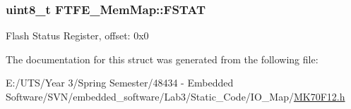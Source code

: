 \subsubsection[{F\+S\+T\+A\+T}]{\setlength{\rightskip}{0pt plus 5cm}uint8\+\_\+t F\+T\+F\+E\+\_\+\+Mem\+Map\+::\+F\+S\+T\+A\+T}\label{struct_f_t_f_e___mem_map_a7e8a4e06df758e3dc251260d71818be8}
Flash Status Register, offset\+: 0x0 

The documentation for this struct was generated from the following file\+:\begin{DoxyCompactItemize}
\item 
E\+:/\+U\+T\+S/\+Year 3/\+Spring Semester/48434 -\/ Embedded Software/\+S\+V\+N/embedded\+\_\+software/\+Lab3/\+Static\+\_\+\+Code/\+I\+O\+\_\+\+Map/\hyperlink{_m_k70_f12_8h}{M\+K70\+F12.\+h}\end{DoxyCompactItemize}
